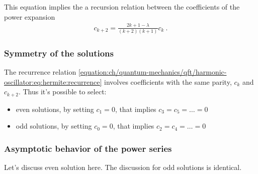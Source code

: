 \documentclass[letterpaper,10pt,english]{jupyterBook}
\begin{document}
\sphinxAtStartPar
This equation implies the a recursion relation between the coefficients of the power expansion
\begin{equation}\label{equation:ch/quantum-mechanics/qft/harmonic-oscillator:eq:hermite:recurrence}
\begin{split}c_{k+2} = \frac{2k + 1 - \lambda}{(k+2)(k+1)} c_k \ .\end{split}
\end{equation}\subsubsection*{Symmetry of the solutions}

\sphinxAtStartPar
The recurrence relation \eqref{equation:ch/quantum-mechanics/qft/harmonic-oscillator:eq:hermite:recurrence} involves coefficients with the same parity, \(c_k\) and \(c_{k+2}\). Thus it’s possible to select:
\begin{itemize}
\item {} 
\sphinxAtStartPar
even solutions, by setting \(c_1 = 0\), that implies \(c_3 = c_5 = \dots = 0\)

\item {} 
\sphinxAtStartPar
odd  solutions, by setting \(c_0 = 0\), that implies \(c_2 = c_4 = \dots = 0\)

\end{itemize}
\subsubsection*{Asymptotic behavior of the power series}

\sphinxAtStartPar
Let’s discuss even solution here. The discussion for odd solutions is identical.
\end{document}
